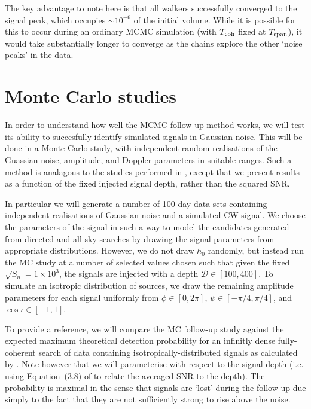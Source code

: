 \documentclass[aps, prd, twocolumn, superscriptaddress, floatfix, showpacs, nofootinbib, longbibliography]{revtex4-1}
\begin{document}
The key advantage to note here is that all walkers successfully converged to the
signal peak, which occupies $\sim 10^{-6}$ of the initial volume. While it is
possible for this to occur during an ordinary MCMC simulation (with $T_{\rm coh}$
fixed at $T_{\rm span}$), it would take substantially longer to converge as the
chains explore the other `noise peaks' in the data.

\section{Monte Carlo studies}

In order to understand how well the MCMC follow-up method works, we will test
its ability to succesfully identify simulated signals in Gaussian noise. This will be
done in a Monte Carlo study, with independent random realisations of the
Guassian noise, amplitude, and Doppler parameters in suitable ranges. Such a
method is analagous to the studies performed in \citet{shaltev2013}, except
that we present results as a function of the fixed injected signal depth,
rather than the squared SNR.

In particular we will generate a number of 100-day data sets containing
independent realisations of Gaussian noise and a simulated CW signal. We choose
the parameters of the signal in such a way to model the candidates generated
from directed and all-sky searches by drawing the signal parameters from
appropriate distributions. However, we do not draw $h_0$ randomly, but instead
run the MC study at a number of selected values chosen such that given the
fixed $\sqrt{S_n}=1\times10^{3}$, the signals are injected with a depth
$\mathcal{D} \in [100, 400]$.  To simulate an isotropic distribution of
sources, we draw the remaining amplitude parameters for each signal uniformly
from $\phi \in [0, 2\pi]$, $\psi \in [-\pi/4, \pi/4]$, and $\cos\iota \in [-1,
1]$.

To provide a reference, we will compare the MC follow-up study against the
expected maximum theoretical detection probability for an infinitly dense
fully-coherent search of data containing isotropically-distributed signals as
calculated by \citet{wette2012}. Note however that we will parameterise with
respect to the signal depth (i.e. using Equation~(3.8) of \citet{wette2012} to
relate the averaged-SNR to the depth). The probability is maximal in the
sense that signals are `lost' during the follow-up due simply to the fact that
they are not sufficiently strong to rise above the noise.
\end{document}
